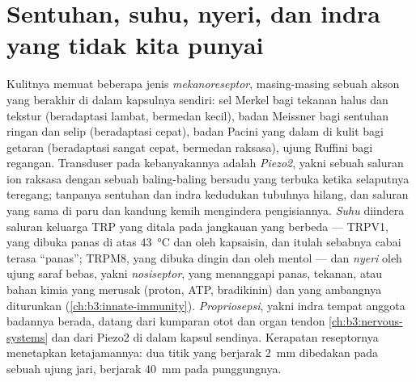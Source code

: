\section{Sentuhan, suhu, nyeri, dan indra yang tidak kita punyai}

\begin{definition}\label{def:b3:sensory-systems:somato}
%
Kulitnya memuat beberapa jenis \emph{mekanoreseptor}, masing-masing sebuah akson
yang berakhir di dalam kapsulnya sendiri: sel Merkel bagi tekanan halus dan tekstur
(beradaptasi lambat, bermedan kecil), badan Meissner bagi sentuhan ringan
dan selip (beradaptasi cepat), badan Pacini yang dalam di kulit bagi
getaran (beradaptasi sangat cepat, bermedan raksasa), ujung Ruffini bagi
regangan. Transduser pada kebanyakannya adalah \emph{Piezo2}, yakni sebuah saluran
ion raksasa dengan sebuah baling-baling bersudu yang terbuka ketika selaputnya
teregang; tanpanya sentuhan dan indra kedudukan tubuhnya
hilang, dan saluran yang sama di paru dan kandung kemih mengindera
pengisiannya. \emph{Suhu} diindera saluran keluarga TRP yang
ditala pada jangkauan yang berbeda --- TRPV1, yang dibuka panas di atas
\qty{43}{\celsius} dan oleh kapsaisin, dan itulah sebabnya cabai terasa ``panas'';
TRPM8, yang dibuka dingin dan oleh mentol --- dan \emph{nyeri} oleh ujung saraf
bebas, yakni \emph{nosiseptor}, yang menanggapi panas, tekanan, atau bahan kimia
yang merusak (proton, ATP, bradikinin) dan yang ambangnya
diturunkan  (\cref{ch:b3:innate-immunity}).
\emph{Propriosepsi}, yakni indra tempat anggota badannya berada, datang dari
kumparan otot dan organ tendon \cref{ch:b3:nervous-systems}
dan dari Piezo2 di dalam kapsul sendinya. Kerapatan reseptornya menetapkan
ketajamannya: dua titik yang berjarak \qty{2}{mm} dibedakan pada sebuah ujung jari,
berjarak \qty{40}{mm} pada punggungnya.
\end{definition}

